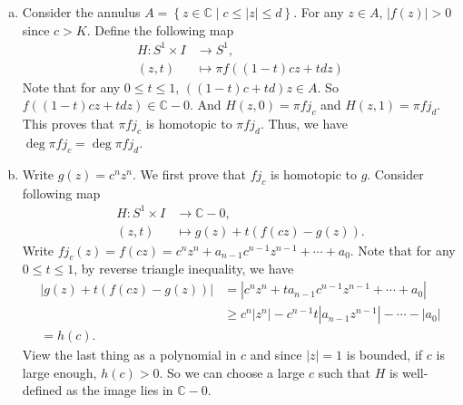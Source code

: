 \documentclass[a4paper, 12pt]{article}
\begin{document}
\begin{solution}
\begin{enumerate}[(a)]
\item Consider the annulus \(A=\left\{ z\in \mathbb{C}\mid c\leq |z|\leq d \right\}\). For any \(z\in A\), \(|f(z)|>0\) since \(c>K\). Define the following map 
\begin{align*}
	H:S^1\times I&\rightarrow S^1,\\ 
	(z,t)&\mapsto \pi f((1-t)cz+tdz)
\end{align*}
Note that for any \(0\leq t\leq 1\), \(((1-t)c+td)z\in A\). So \(f((1-t)cz+tdz)\in \mathbb{C}-0\). And \(H(z,0)=\pi fj_c\) and \(H(z,1)=\pi fj_d\). This proves that \(\pi fj_c\) is homotopic to 
\(\pi fj_d\). Thus, we have \(\deg \pi fj_c=\deg \pi fj_d\). 
\item Write \(g(z)=c^nz^n\). We first prove that \(fj_c\) is homotopic to \(g\). Consider following map 
\begin{align*}
	H:S^1\times I&\rightarrow \mathbb{C}-0,\\ 
	(z,t)&\mapsto g(z)+t(f(cz)-g(z)).
\end{align*}
Write \(fj_c(z)=f(cz)=c^nz^n+a_{n-1}c^{n-1}z^{n-1}+\cdots+a_0\). Note that for any \(0\leq t\leq 1\), by reverse triangle inequality, we have 
\begin{align*}
	|g(z)+t(f(cz)-g(z))|&=|c^nz^n+ta_{n-1}c^{n-1}z^{n-1}+\cdots+a_0|\\ 
	                    &\geq c^n|z^n|-c^{n-1}t|a_{n-1}z^{n-1}|-\cdots-|a_0|\\ 
						=h(c).
\end{align*}
View the last thing as a polynomial in \(c\) and since \(|z|=1\) is bounded, if \(c\) is large enough, \(h(c)>0\). So we can choose a large \(c\) such that \(H\) is well-defined as the image lies in 
\(\mathbb{C}-0\). 


\end{enumerate}
\end{solution}
\end{document}
